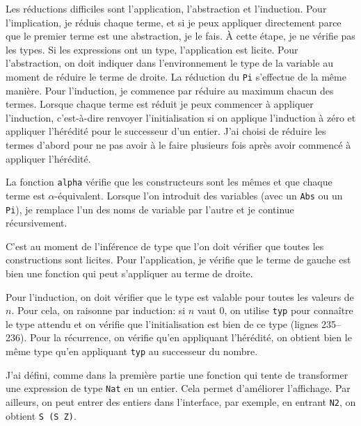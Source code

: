 \documentclass[a4paper]{article}
\begin{document}
    Les réductions difficiles sont l'application, l'abstraction et l'induction. Pour l'implication, je réduis chaque terme, et si je peux appliquer directement parce que le premier terme est une abstraction, je le fais. À cette étape, je ne vérifie pas les types. Si les expressions ont un type, l'application est licite. Pour l'abstraction, on doit indiquer dans l'environnement le type de la variable au moment de réduire le terme de droite. La réduction du \verb|Pi| s'effectue de la même manière. Pour l'induction, je commence par réduire au maximum chacun des termes. Lorsque chaque terme est réduit je peux commencer à appliquer l'induction, c'est-à-dire renvoyer l'initialisation si on applique l'induction à zéro et appliquer l'hérédité pour le successeur d'un entier. J'ai choisi de réduire les termes d'abord pour ne pas avoir à le faire plusieurs fois après avoir commencé à appliquer l'hérédité. 


    La fonction \verb|alpha| vérifie que les constructeurs sont les mêmes et que chaque terme est $\alpha$-équivalent. Lorsque l'on introduit des variables (avec un \verb|Abs| ou un \verb|Pi|), je remplace l'un des noms de variable par l'autre et je continue récursivement.
    
    C'est au moment de l'inférence de type que l'on doit vérifier que toutes les constructions sont licites. Pour l'application, je vérifie que le terme de gauche est bien une fonction qui peut s'appliquer au terme de droite. 

    Pour l'induction, on doit vérifier que le type est valable pour toutes les valeurs de $n$. Pour cela, on raisonne par induction: si $n$ vaut $0$, on utilise \verb|typ| pour connaître le type attendu et on vérifie que l'initialisation est bien de ce type (lignes 235--236). Pour la récurrence, on vérifie qu'en appliquant l'hérédité, on obtient bien le même type qu'en appliquant \verb|typ| au successeur du nombre.  

    J'ai défini, comme dans la première partie une fonction qui tente de transformer une expression de type \verb|Nat| en un entier. Cela permet d'améliorer l'affichage. Par ailleurs, on peut entrer des entiers dans l'interface, par exemple, en entrant \verb|N2|, on obtient \verb|S (S Z)|.
\end{document}

